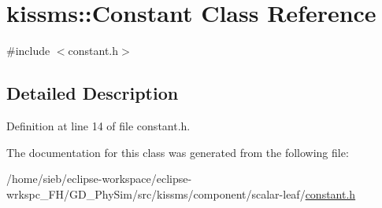 \hypertarget{classkissms_1_1_constant}{\section{kissms\-:\-:Constant Class Reference}
\label{classkissms_1_1_constant}
}


{\ttfamily \#include $<$constant.\-h$>$}



\subsection{Detailed Description}


Definition at line 14 of file constant.\-h.



The documentation for this class was generated from the following file\-:\begin{DoxyCompactItemize}
\item 
/home/sieb/eclipse-\/workspace/eclipse-\/wrkspc\-\_\-\-F\-H/\-G\-D\-\_\-\-Phy\-Sim/src/kissms/component/scalar-\/leaf/\hyperlink{constant_8h}{constant.\-h}\end{DoxyCompactItemize}

